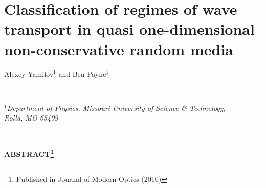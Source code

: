 % 
% 
% 

 
\chapter{Classification of regimes of wave transport in quasi one-dimensional non-conservative random media}
\label{chap:regimes}
\label{paper:2_start}

% 
\begin{center}
Alexey Yamilov$^1$ and Ben Payne$^1$
\end{center}

\ \\
\begin{center}
\textit{$^1$Department of Physics, Missouri University of Science \& Technology,\\ Rolla, MO 65409}
\end{center}

\ \\
% 
\begin{center}\textbf{ABSTRACT\footnote{Published in Journal of Modern Optics (2010)}}        \end{center}

